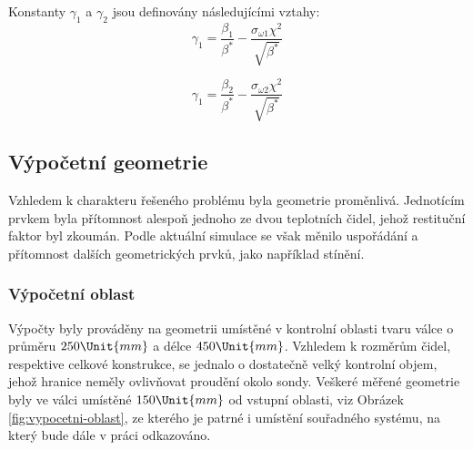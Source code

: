        \noindent Konstanty $\gamma _1$ a $\gamma _2$ jsou definovány následujícími vztahy:
        \begin{equation}
            \gamma _1 = \frac{\beta _1}{\beta ^*} - \frac{\sigma _{\omega 1} \chi ^2}{\sqrt{\beta ^*}}
        \end{equation}

        \begin{equation}
            \gamma _1 = \frac{\beta _2}{\beta ^*} - \frac{\sigma _{\omega 2} \chi ^2}{\sqrt{\beta ^*}}
        \end{equation}

    \newpage
    \subsection{Výpočetní geometrie}
        Vzhledem k charakteru řešeného problému byla geometrie proměnlivá. Jednotícím prvkem byla přítomnost alespoň jednoho ze dvou teplotních čidel, jehož restituční faktor byl zkoumán. Podle aktuální simulace se však měnilo uspořádání a přítomnost dalších geometrických prvků, jako například stínění.
    
        \subsubsection{Výpočetní oblast}
            Výpočty byly prováděny na geometrii umístěné v kontrolní oblasti tvaru válce o průměru $250 \Unit{mm}$ a délce $450 \Unit{mm}$. Vzhledem k rozměrům čidel, respektive celkové konstrukce, se jednalo o dostatečně velký kontrolní objem, jehož hranice neměly ovlivňovat proudění okolo sondy. Veškeré měřené geometrie byly ve válci umístěné $150 \Unit{mm}$ od vstupní oblasti, viz Obrázek \ref{fig:vypocetni-oblast}, ze kterého je patrné i umístění souřadného systému, na který bude dále v práci odkazováno.
            
